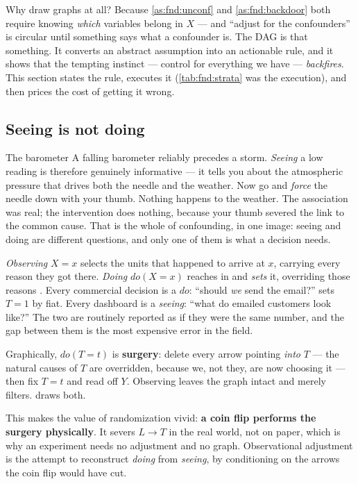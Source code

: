 Why draw graphs at all? Because \cref{as:fnd:unconf} and \cref{as:fnd:backdoor} both require
knowing \emph{which} variables belong in $X$ --- and ``adjust for the confounders'' is circular
until something says what a confounder is. The DAG is that something. It converts an abstract
assumption into an actionable rule, and it shows that the tempting instinct --- control for
everything we have --- \emph{backfires}. This section states the rule, executes it
(\cref{tab:fnd:strata} was the execution), and then prices the cost of getting it wrong.

\subsection*{Seeing is not doing}

\begin{intuition}{The barometer}
A falling barometer reliably precedes a storm. \emph{Seeing} a low reading is therefore
genuinely informative --- it tells you about the atmospheric pressure that drives both the
needle and the weather. Now go and \emph{force} the needle down with your thumb. Nothing
happens to the weather. The association was real; the intervention does nothing, because your
thumb severed the link to the common cause. That is the whole of confounding, in one image:
seeing and doing are different questions, and only one of them is what a decision needs.
\end{intuition}

\emph{Observing} $X = x$ selects the units that happened to arrive at $x$, carrying every reason
they got there. \emph{Doing} $do(X = x)$ reaches in and \emph{sets} it, overriding those reasons
\citep{pearl2009}. Every commercial decision is a $do$: ``should \emph{we} send the email?''
sets $T = 1$ by fiat. Every dashboard is a \emph{seeing}: ``what do emailed customers look
like?'' The two are routinely reported as if they were the same number, and the gap between them
is the most expensive error in the field.

Graphically, $do(T = t)$ is \textbf{surgery}: delete every arrow pointing \emph{into} $T$ --- the
natural causes of $T$ are overridden, because we, not they, are now choosing it --- then fix
$T = t$ and read off $Y$. Observing leaves the graph intact and merely filters.
 draws both.



This makes the value of randomization vivid: \textbf{a coin flip performs the surgery
physically}. It severs $L \rightarrow T$ in the real world, not on paper, which is why an
experiment needs no adjustment and no graph. Observational adjustment is the attempt to
reconstruct \emph{doing} from \emph{seeing}, by conditioning on the arrows the coin flip would
have cut.

